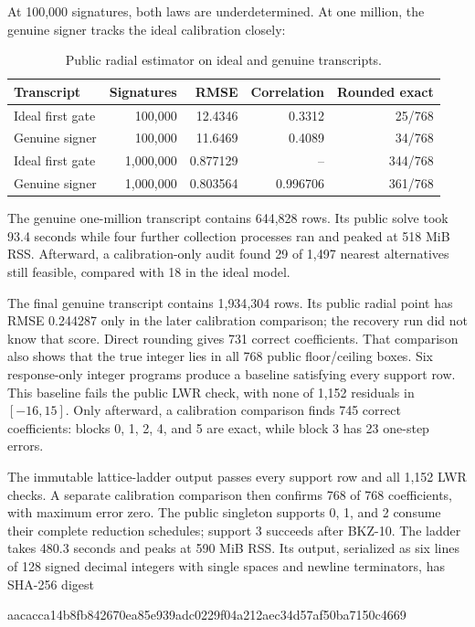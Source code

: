 \documentclass[11pt,a4paper]{article}
\newcommand{\RealRows}{1{,}934{,}304}
\newcommand{\RealRadialRMSE}{0.244287}
\newcommand{\RealRoundedExact}{731}
\newcommand{\RealLatticeSeconds}{480.3}
\newcommand{\RecoveryHash}{aacacca14b8fb842670ea85e939adc0229f04a212aec34d57af50ba7150c4669}
\begin{document}
At 100,000 signatures, both laws are underdetermined.  At one million, the
genuine signer tracks the ideal calibration closely:

\begin{table}[ht]
\centering
\caption{Public radial estimator on ideal and genuine transcripts.}
\begin{tabular}{@{}lrrrr@{}}
\toprule
Transcript & Signatures & RMSE & Correlation & Rounded exact\\
\midrule
Ideal first gate & 100,000   & 12.4346  & 0.3312   & 25/768\\
Genuine signer   & 100,000   & 11.6469  & 0.4089   & 34/768\\
Ideal first gate & 1,000,000 & 0.877129 & --       & 344/768\\
Genuine signer   & 1,000,000 & 0.803564 & 0.996706 & 361/768\\
\bottomrule
\end{tabular}
\label{tab:checkpoints}
\end{table}

The genuine one-million transcript contains 644,828 rows.  Its public solve
took 93.4 seconds while four further collection processes ran and peaked at
518 MiB RSS.  Afterward, a calibration-only audit found 29 of 1,497 nearest
alternatives still feasible, compared with 18 in the ideal model.

The final genuine transcript contains \RealRows{} rows.  Its public radial
point has RMSE \RealRadialRMSE{} only in the later calibration comparison;
the recovery run did not know that score.  Direct rounding gives
\RealRoundedExact{} correct coefficients.  That comparison also shows that the
true integer lies in all 768 public floor/ceiling boxes.  Six response-only integer programs produce a
baseline satisfying every support row.  This baseline fails the public LWR
check, with none of 1,152 residuals in $[-16,15]$.  Only afterward, a
calibration comparison finds 745 correct coefficients: blocks 0, 1, 2, 4,
and 5 are exact, while block 3 has 23 one-step errors.

The immutable lattice-ladder output passes every support row and all 1,152
LWR checks.  A separate calibration comparison then confirms 768 of 768
coefficients, with maximum error zero.  The public singleton supports 0, 1,
and 2 consume their complete reduction schedules; support 3 succeeds after
BKZ-10.  The ladder takes \RealLatticeSeconds{} seconds and peaks at 590 MiB
RSS.  Its output, serialized as six lines of 128 signed decimal integers with
single spaces and newline terminators, has SHA-256 digest
\begin{center}
{\ttfamily\small \RecoveryHash}
\end{center}
\end{document}
